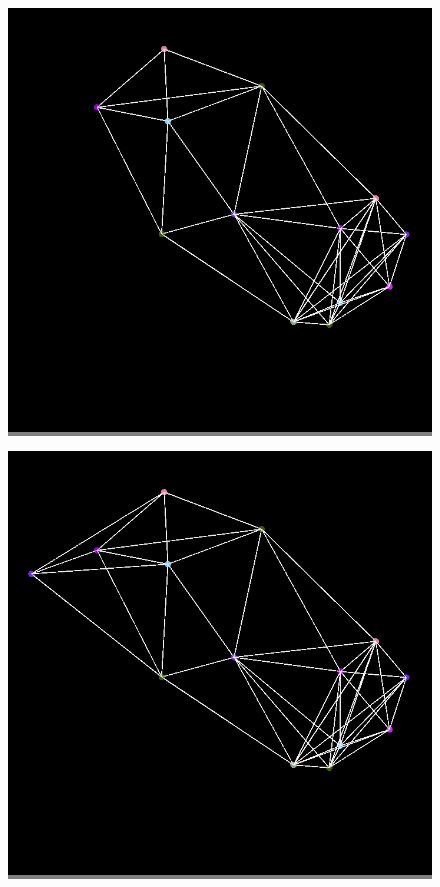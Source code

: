 \documentclass{article}
\begin{document}
\begin{figure}
\begin{minipage}{0.2\textwidth}
            \end{minipage}
            \vskip 0.1in
            \begin{minipage}{0.2\textwidth}
            \colorbox{gray}{\includegraphics[width=\linewidth]{./images/color-13.png}}
            \end{minipage}
            \hspace{\fill}
            \begin{minipage}{0.2\textwidth}
            \colorbox{gray}{\includegraphics[width=\linewidth]{./images/color-14.png}}

\end{minipage}
\end{figure}
\end{document}
